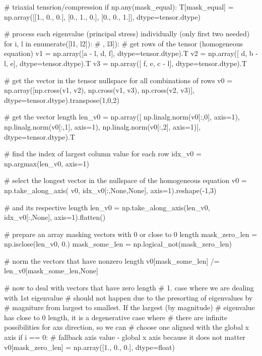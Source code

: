 \begin{itemize}
\begin{python}
    # triaxial tensrion/compression
    if np.any(mask_equal):
        T[mask_equal] = np.array([[1., 0., 0.], [0., 1., 0.], [0., 0., 1.]], dtype=tensor.dtype)

    # process each eigenvalue (principal stress) individually (only first two needed)
    for i, l in enumerate([l1, l2]): # , l3]):
        # get rows of the tensor (homogeneous equation)
        v1 = np.array([a - l,     d,     f], dtype=tensor.dtype).T
        v2 = np.array([    d, b - l,     e], dtype=tensor.dtype).T
        v3 = np.array([    f,     e, c - l], dtype=tensor.dtype).T

        # get the vector in the tensor nullspace for all combinations of rows
        v0 = np.array([np.cross(v1, v2),
                       np.cross(v1, v3),
                       np.cross(v2, v3)], dtype=tensor.dtype).transpose(1,0,2)

        # get the vector length
        len_v0 = np.array([
            np.linalg.norm(v0[:,0], axis=1),
            np.linalg.norm(v0[:,1], axis=1),
            np.linalg.norm(v0[:,2], axis=1)], dtype=tensor.dtype).T

        # find the index of largest column value for each row
        idx_v0 = np.argmax(len_v0, axis=1)

        # select the longest vector in the nullspace of the homogeneous equation
        v0     = np.take_along_axis(    v0, idx_v0[:,None,None], axis=1).reshape(-1,3)

        # and its respective length
        len_v0 = np.take_along_axis(len_v0,      idx_v0[:,None], axis=1).flatten()

        # prepare an array masking vectors with 0 or close to 0 length
        mask_zero_len = np.isclose(len_v0, 0.)
        mask_some_len = np.logical_not(mask_zero_len)

        # norm the vectors that have nonzero length
        v0[mask_some_len] /= len_v0[mask_some_len,None]

        # now to deal with vectors that have zero length
        # 1. case where we are dealing with 1st eigenvalue
        # should not happen due to the presorting of eigenvalues by
        # magniture from largest to smallest. If the largest (by magnitude)
        # eigenvalue has close to 0 length, it is a degenerative case where
        # there are infinite possibilities for axs direction, so we can
        # choose one aligned with the global x axis
        if i == 0:
            # fallback axis value - global x axis because it does not matter
            v0[mask_zero_len] = np.array([1., 0., 0.], dtype=float)


\end{python}
\end{itemize}
